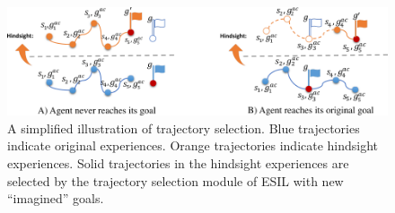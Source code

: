 \begin{figure}[t!]
  \centering
  \includegraphics[width=\columnwidth]{figures/chapter3/hgs.png}
  \caption{A simplified illustration of trajectory selection. Blue trajectories indicate original experiences. Orange trajectories indicate hindsight experiences. Solid trajectories in the hindsight experiences are selected by the trajectory selection module of ESIL with new ``imagined'' goals.}
  \label{fig:hs_princple}
\end{figure}

